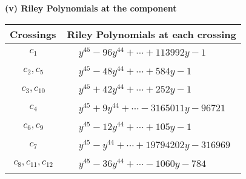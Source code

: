 \documentclass[1p]{elsarticle_modified}
\theoremstyle{definition}
\begin{document}
\flushleft \textbf{(v) Riley Polynomials at the component}\newline \\
\begin{tabular}{m{50pt}|m{274pt}}
Crossings & \hspace{64pt}Riley Polynomials at each crossing \\
\hline $$\begin{aligned}c_{1}\end{aligned}$$&$\begin{aligned}
&y^{45}-96 y^{44}+\cdots+113992 y-1
\end{aligned}$\\
\hline $$\begin{aligned}c_{2},c_{5}\end{aligned}$$&$\begin{aligned}
&y^{45}-48 y^{44}+\cdots+584 y-1
\end{aligned}$\\
\hline $$\begin{aligned}c_{3},c_{10}\end{aligned}$$&$\begin{aligned}
&y^{45}+42 y^{44}+\cdots+252 y-1
\end{aligned}$\\
\hline $$\begin{aligned}c_{4}\end{aligned}$$&$\begin{aligned}
&y^{45}+9 y^{44}+\cdots-3165011 y-96721
\end{aligned}$\\
\hline $$\begin{aligned}c_{6},c_{9}\end{aligned}$$&$\begin{aligned}
&y^{45}-12 y^{44}+\cdots+105 y-1
\end{aligned}$\\
\hline $$\begin{aligned}c_{7}\end{aligned}$$&$\begin{aligned}
&y^{45}- y^{44}+\cdots+19794202 y-316969
\end{aligned}$\\
\hline $$\begin{aligned}c_{8},c_{11},c_{12}\end{aligned}$$&$\begin{aligned}
&y^{45}-36 y^{44}+\cdots-1060 y-784
\end{aligned}$\\
\hline
\end{tabular}\\~\\
\end{document}
